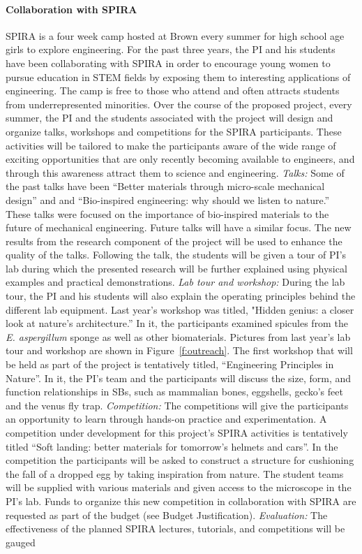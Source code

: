 \documentclass[10pt,letterpaper]{article}
\begin{document}
  \paragraph{Collaboration with SPIRA}
    SPIRA is a four week camp hosted at Brown every summer for high school age girls to explore engineering. For the past three years, the PI and his students have been collaborating with SPIRA in order to encourage young women to pursue education in STEM fields by exposing them to interesting applications of engineering. The camp is free to those who attend and often attracts students from underrepresented minorities.  Over the course of the proposed project, every summer, the PI and the students associated with the project will design and organize talks, workshops and competitions for the SPIRA participants. These activities will be tailored to make the participants aware of the wide range of exciting opportunities that are only recently becoming available to engineers, and through this awareness attract them to science and engineering. \emph{Talks:} Some of the past talks have been  ``Better materials through micro-scale mechanical design'' and and ``Bio-inspired engineering: why should we listen to nature.'' These talks were focused on the importance of bio-inspired materials to the future of mechanical engineering. Future talks will have a similar focus. The new results from the research component of the project will be used to enhance the quality of the talks. Following the talk, the students will be given a tour of PI's lab during which the presented research will be further explained using  physical examples and  practical demonstrations. \emph{Lab tour and workshop:} During the lab tour, the PI and his students will also explain the operating principles behind the different lab equipment. Last year's workshop was titled, "Hidden genius: a closer look at nature's architecture.'' In it, the participants examined spicules from the \textit{E. aspergillum} sponge as well as other biomaterials.  Pictures from  last  year's lab tour and workshop are shown in Figure~\ref{f:outreach}. The first workshop that will be held as part of the project is tentatively titled, ``Engineering Principles in Nature''.  In it, the PI's team and the participants will discuss the size, form, and function relationships in SBs, such as mammalian bones, eggshells, gecko's feet and the venus fly trap. \emph{Competition:} The competitions will give the participants an opportunity to learn through hands-on practice and experimentation. A competition under development for this project's SPIRA activities is tentatively titled ``Soft landing: better materials for tomorrow's helmets and cars''. In the competition the participants will be asked to construct a structure for cushioning the fall of a dropped egg by taking inspiration from nature. The student teams will be supplied with various materials and given access to the microscope in the PI's lab. Funds to organize this new competition in collaboration with SPIRA are requested as part of the budget (see Budget Justification). \emph{Evaluation:} The effectiveness of the planned SPIRA lectures, tutorials, and competitions will be gauged 
\end{document}
